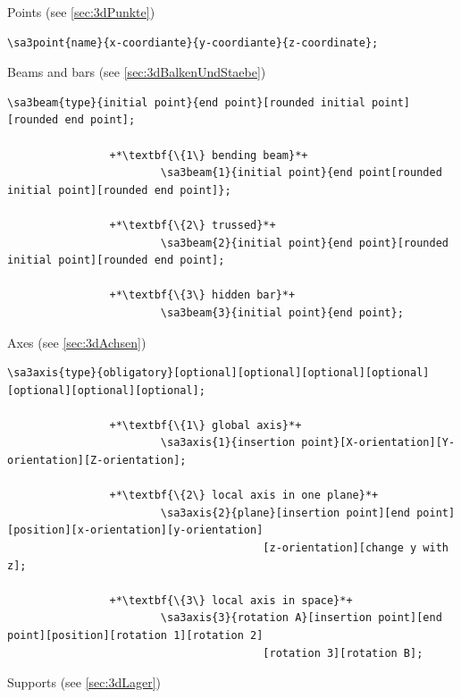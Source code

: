 \documentclass[%
  a4paper,
  BCOR=20mm,
  numbers=noenddot,
  twoside,
  parskip=half,
  openright,
  version=last,
]{scrreprt}
\begin{document}
Points (see \ref{sec:3dPunkte})

\begin{lstlisting}[emph={dpoint},backgroundcolor=\color{white}]
		\sa3point{name}{x-coordiante}{y-coordiante}{z-coordinate};
\end{lstlisting}\vspace{-10mm}

Beams and bars (see \ref{sec:3dBalkenUndStaebe})

\begin{lstlisting}[emph={dbeam},backgroundcolor=\color{white}]
		\sa3beam{type}{initial point}{end point}[rounded initial point][rounded end point];
		
				+*\textbf{\{1\} bending beam}*+
						\sa3beam{1}{initial point}{end point[rounded initial point][rounded end point]};
						
				+*\textbf{\{2\} trussed}*+
						\sa3beam{2}{initial point}{end point}[rounded initial point][rounded end point];
						
				+*\textbf{\{3\} hidden bar}*+
						\sa3beam{3}{initial point}{end point};
\end{lstlisting}\vspace{-10mm}

Axes (see \ref{sec:3dAchsen})

\begin{lstlisting}[emph={daxis},backgroundcolor=\color{white}]
		\sa3axis{type}{obligatory}[optional][optional][optional][optional][optional][optional][optional];
		
				+*\textbf{\{1\} global axis}*+
						\sa3axis{1}{insertion point}[X-orientation][Y-orientation][Z-orientation];
						
				+*\textbf{\{2\} local axis in one plane}*+
						\sa3axis{2}{plane}[insertion point][end point][position][x-orientation][y-orientation]
										[z-orientation][change y with z];
						
				+*\textbf{\{3\} local axis in space}*+
						\sa3axis{3}{rotation A}[insertion point][end point][position][rotation 1][rotation 2]
										[rotation 3][rotation B];
\end{lstlisting}\vspace{-10mm}

Supports (see \ref{sec:3dLager})
\end{document}
